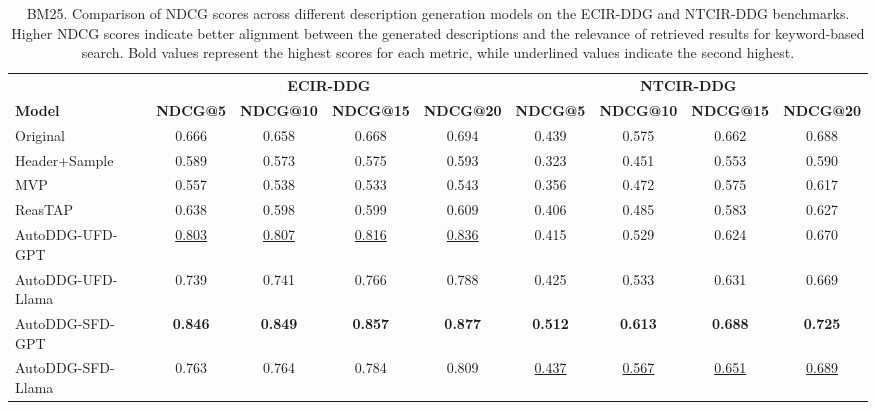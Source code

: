 \begin{table*}[h!]
    \centering
    \begin{tabular}{l|cccc|cccc}
        \hline
         & \multicolumn{4}{c|}{\bf ECIR-DDG} & \multicolumn{4}{c}{\bf NTCIR-DDG} \\
         \bf Model & \bf NDCG@5 & \bf NDCG@10 & \bf NDCG@15 & \bf NDCG@20 & \bf NDCG@5 & \bf NDCG@10 & \bf NDCG@15 & \bf NDCG@20 \\
        \hline
         Original & 0.666 & 0.658 & 0.668 & 0.694 & 0.439 & 0.575 & 0.662 & 0.688\\
         \hline
         Header+Sample & 0.589 & 0.573 & 0.575 & 0.593 & 0.323 & 0.451 & 0.553 & 0.590\\
         MVP & 0.557 & 0.538 & 0.533 & 0.543 & 0.356 & 0.472 & 0.575 & 0.617\\
         ReasTAP & 0.638 & 0.598 & 0.599 & 0.609 & 0.406 & 0.485 & 0.583 & 0.627\\
         \hline
         AutoDDG-UFD-GPT & \underline{0.803} & \underline{0.807} & \underline{0.816} & \underline{0.836} & 0.415 & 0.529 & 0.624 & 0.670\\
         AutoDDG-UFD-Llama & 0.739 & 0.741 & 0.766 & 0.788 & 0.425 & 0.533 & 0.631 & 0.669 \\
         AutoDDG-SFD-GPT & \bf 0.846 & \bf 0.849 & \bf 0.857 & \bf 0.877 & \bf 0.512 & \bf 0.613 & \bf 0.688 & \bf 0.725 \\
         AutoDDG-SFD-Llama & 0.763 & 0.764 & 0.784 & 0.809 & \underline{0.437} & \underline{0.567} & \underline{0.651} & \underline{0.689}\\
      \hline
    \end{tabular}
    \caption{BM25. Comparison of NDCG scores across different description generation models on the ECIR-DDG and NTCIR-DDG benchmarks. Higher NDCG scores indicate better alignment between the generated descriptions and the relevance of retrieved results for keyword-based search. Bold values represent the highest scores for each metric, while underlined values indicate the second highest.
    }
    \label{tab:ndcg_bm25}
    \vspace{-0.77cm}
\end{table*}



